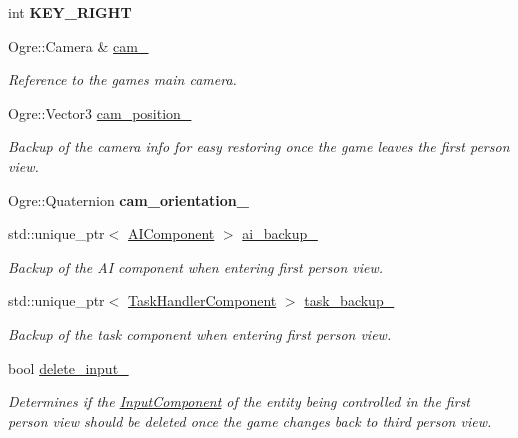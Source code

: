 \begin{DoxyCompactItemize}
\item 
int {\bfseries K\+E\+Y\+\_\+\+R\+I\+G\+HT}\hypertarget{class_input_system_a556ac5ca7ba4ac40ff868b3c1effbdb3}{}\label{class_input_system_a556ac5ca7ba4ac40ff868b3c1effbdb3}

\item 
Ogre\+::\+Camera \& \hyperlink{class_input_system_a7725c6f5b40f31c3bd89c55a44641cb7}{cam\+\_\+}
\begin{DoxyCompactList}\small\item\em Reference to the game\textquotesingle{}s main camera. \end{DoxyCompactList}\item 
Ogre\+::\+Vector3 \hyperlink{class_input_system_a06dc8cddfde4ecde07008cdb5bd4458e}{cam\+\_\+position\+\_\+}
\begin{DoxyCompactList}\small\item\em Backup of the camera info for easy restoring once the game leaves the first person view. \end{DoxyCompactList}\item 
Ogre\+::\+Quaternion {\bfseries cam\+\_\+orientation\+\_\+}\hypertarget{class_input_system_a76936e44fc531e9b448fdfae587bb7d0}{}\label{class_input_system_a76936e44fc531e9b448fdfae587bb7d0}

\item 
std\+::unique\+\_\+ptr$<$ \hyperlink{struct_a_i_component}{A\+I\+Component} $>$ \hyperlink{class_input_system_a4db625dcec72e55ecc0c4b0b52f5263a}{ai\+\_\+backup\+\_\+}
\begin{DoxyCompactList}\small\item\em Backup of the AI component when entering first person view. \end{DoxyCompactList}\item 
std\+::unique\+\_\+ptr$<$ \hyperlink{struct_task_handler_component}{Task\+Handler\+Component} $>$ \hyperlink{class_input_system_af5cf64f0c19712f6f792cfd75d247ad1}{task\+\_\+backup\+\_\+}
\begin{DoxyCompactList}\small\item\em Backup of the task component when entering first person view. \end{DoxyCompactList}\item 
bool \hyperlink{class_input_system_a549e0c521082a6ff97c2b9349d000cb0}{delete\+\_\+input\+\_\+}
\begin{DoxyCompactList}\small\item\em Determines if the \hyperlink{struct_input_component}{Input\+Component} of the entity being controlled in the first person view should be deleted once the game changes back to third person view. \end{DoxyCompactList}\end{DoxyCompactItemize}


